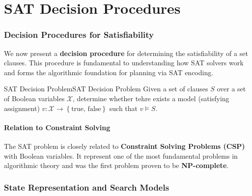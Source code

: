 \documentclass[a4paper]{article}
\theoremstyle{definition}
\begin{document}
\part{SAT Decision Procedures}
\section{Decision Procedures for Satisfiability}
We now present a \textbf{decision procedure} for determining the satisfiability of a set clauses. This procedure is fundamental to understanding 
how SAT solvers work and forms the algorithmic foundation for planning via SAT encoding.
\begin{definition}{SAT Decision Problem}{SAT Decision Problem}
Given a set of clauses \( S \) over a set of Boolean variables \( \mathcal{X} \), determine whether tehre exists a model (satisfying assignment)
\( v : \mathcal{X} \rightarrow \left\{ \text{true, false} \right\} \) such that \( v \models S \).
\end{definition}
\subsection{Relation to Constraint Solving}
The SAT problem is closely related to \textbf{Constraint Solving Problems (CSP)} with Boolean variables. It represent 
one of the most fundamental problems in algorithmic theory and was the first problem proven to be \textbf{NP-complete}.
\section{State Representation and Search Models}
\end{document}
